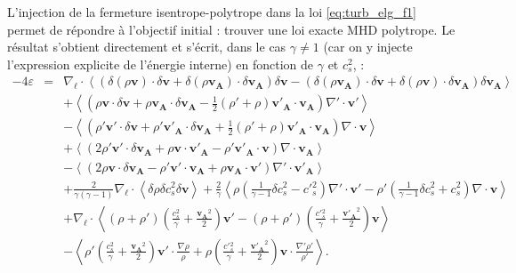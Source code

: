  L'injection de la fermeture isentrope-polytrope dans la loi \eqref{eq:turb_elg_f1} permet de répondre à l'objectif initial : trouver une loi exacte \ac{MHD} polytrope. Le résultat s'obtient directement et s'écrit, dans le cas $\gamma \neq 1$ (car on y injecte l'expression explicite de l'énergie interne) en fonction de $\gamma$ et $c^2_s$, : 
\begin{equation}
\label{eq:turb_elpol_f1}
\boxed{
\begin{array}{rcl}
-4\varepsilon &=& \nabla_{\boldsymbol{\ell}} \cdot \left<\left(\delta \left(\rho\boldsymbol{v}\right) \cdot \delta \boldsymbol{v}+ \delta \left(\rho\boldsymbol{v_A}\right) \cdot \delta \boldsymbol{v_A} \right)\delta \boldsymbol{v}  -\left(\delta \left(\rho\boldsymbol{v_A}\right) \cdot \delta \boldsymbol{v}  + \delta \left(\rho\boldsymbol{v}\right) \cdot \delta \boldsymbol{v_A}  \right) \delta \boldsymbol{v_A} \right>\\
&& +\left< \left(\rho \boldsymbol{v} \cdot \delta \boldsymbol{v} +\rho \boldsymbol{v_A} \cdot \delta \boldsymbol{v_A} -\frac{1}{2} \left(\rho'+\rho\right) \boldsymbol{v'_A} \cdot \boldsymbol{v_A} \right) \nabla' \cdot \boldsymbol{v'} \right>\\
&& -\left< \left(\rho' \boldsymbol{v'} \cdot \delta \boldsymbol{v} + \rho' \boldsymbol{v'_A} \cdot \delta \boldsymbol{v_A} + \frac{1}{2} \left(\rho'+\rho\right) \boldsymbol{v'_A} \cdot \boldsymbol{v_A}  \right)\nabla \cdot \boldsymbol{v}\right>\\
&&+ \left<\left(2 \rho' \boldsymbol{v'} \cdot \delta \boldsymbol{v_A}+\rho \boldsymbol{v} \cdot \boldsymbol{v'_A} - \rho' \boldsymbol{v'_A} \cdot \boldsymbol{v}  \right)\nabla \cdot \boldsymbol{v_A}\right>\\
&&- \left<\left(2\rho \boldsymbol{v} \cdot \delta \boldsymbol{v_A} -\rho' \boldsymbol{v'} \cdot \boldsymbol{v_A} +  \rho \boldsymbol{v_A} \cdot \boldsymbol{v'} \right)\nabla' \cdot \boldsymbol{v'_A}\right> \\
&&+ \frac{2}{\gamma\left(\gamma-1\right)} \nabla_{\boldsymbol{\ell}} \cdot \left<\delta \rho  \delta c^2_s \delta \boldsymbol{v}\right> + \frac{2}{\gamma} \left<\rho \left(\frac{1}{\gamma-1} \delta c^2_s - c'{}^2_s\right)\nabla' \cdot \boldsymbol{v'}  - \rho' \left(\frac{1}{\gamma-1}\delta c^2_s + c^2_s\right) \nabla \cdot \boldsymbol{v} \right>\\
&&+  \nabla_{\boldsymbol{\ell}} \cdot \left< \left(\rho+\rho'\right) \left(\frac{c^2_s}{\gamma}+\frac{\boldsymbol{v_A}^2}{2}\right) \boldsymbol{v'} -  \left(\rho+\rho'\right) \left(\frac{c'{}^2_s}{\gamma}+\frac{\boldsymbol{v'_A}^2}{2}\right)  \boldsymbol{v} \right>\\
&&- \left<\rho' \left(\frac{c^2_s}{\gamma}+\frac{\boldsymbol{v_A}^2}{2}\right)  \boldsymbol{v'} \cdot \frac{\nabla \rho}{\rho} + \rho \left(\frac{c'{}^2_s}{\gamma}+\frac{\boldsymbol{v'_A}^2}{2}\right)  \boldsymbol{v} \cdot \frac{\nabla' \rho'}{\rho'} \right>.
\end{array}}
\end{equation} 
